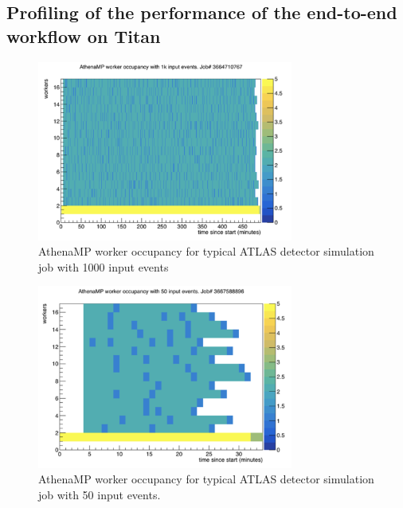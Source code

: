 
%
%

\subsection{Profiling of the performance of the end-to-end workflow on Titan}
\label{subsec:profiling}

\begin{figure}
  \includegraphics[width=0.75\textwidth]{images/Figure_6_placeholder.png}
\caption{AthenaMP worker occupancy for typical ATLAS detector simulation job
with 1000 input events}
\label{fig:athena1000}
\end{figure}

\begin{figure}
  \includegraphics[width=0.75\textwidth]{images/Figure_7_placeholder.png}
\caption{AthenaMP worker occupancy for typical ATLAS detector simulation job
with 50 input events.}
\label{fig:athena50}
\end{figure}


